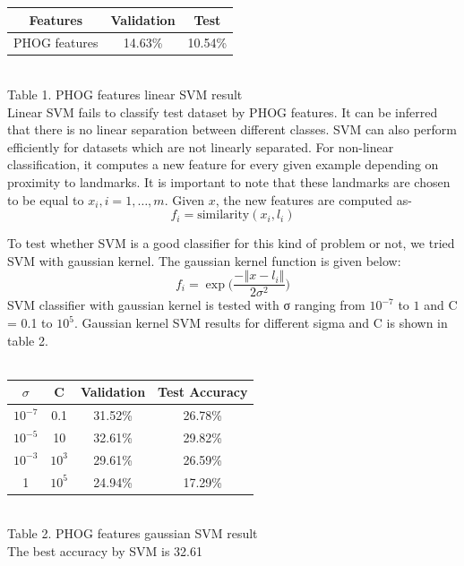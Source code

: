 \documentclass[10pt,twocolumn]{article}
\begin{document}
\begin{tabular}{|c|c|c|}
\hline
Features & Validation & Test \\
\hline
PHOG features &	14.63\% &	10.54\% \\
\hline
\end{tabular}
\\

Table 1. PHOG features linear SVM result
\\

Linear SVM fails to classify test dataset by PHOG features. It can be inferred that there is no linear separation between different classes.
SVM can also perform efficiently for datasets which are not linearly separated. For non-linear classification, it computes a new feature for every given example depending on proximity to landmarks. It is important to note that these landmarks are chosen to be equal to $x_i, i=1,…,m$. Given $x$, the new features are computed as-
\[f_i=\text{similarity}(x_i,l_i)\]
 
To test whether SVM is a good classifier for this kind of problem or not, we tried SVM with gaussian kernel. The gaussian kernel function is given below:
\[f_i=\exp\Big(\frac{-‖x-l_i ‖}{2\sigma^2 }\Big)\]
\cite {larochelle2007empirical} SVM classifier with gaussian kernel is tested with σ ranging from $10^{-7}$ to $1$ and C = 0.1 to $10^5$. Gaussian kernel SVM results for different sigma and C is shown in table 2.
\\
\\
\begin{tabular}{|c|c|c|c|}
\hline
$\sigma$ & C &	Validation & Test Accuracy \\
\hline
$10^{-7}$  & 0.1	& 31.52\%	& 26.78\% \\
$10^{-5}$	 & 10	& 32.61\%	& 29.82\% \\
$10^{-3}$	 & $10^3$ & 29.61\%	& 26.59\% \\
1        &$10^5$ & 	24.94\% & 	17.29\% \\
\hline
\end{tabular}
\\

Table 2. PHOG features gaussian SVM result
\\

The best accuracy by SVM is 32.61%
\end{document}
